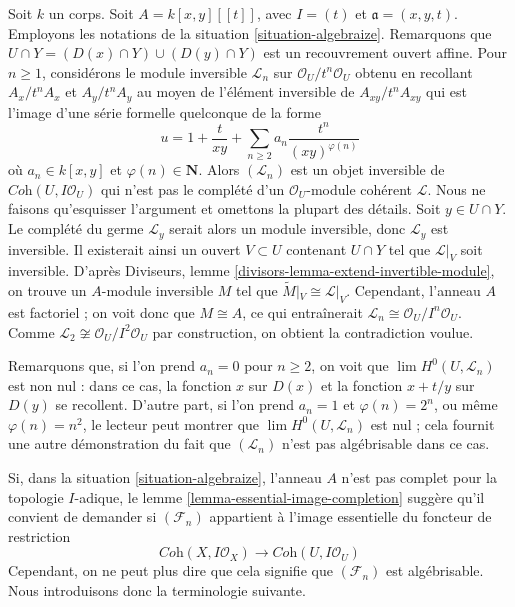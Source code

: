 \begin{example}
\label{example-not-algebraizable}
Soit $k$ un corps. Soit $A = k[x, y][[t]]$, avec $I = (t)$ et
$\mathfrak a = (x, y, t)$. Employons les notations de la
situation \ref{situation-algebraize}. Remarquons que
$U \cap Y = (D(x) \cap Y) \cup (D(y) \cap Y)$ est un recouvrement
ouvert affine. Pour $n \geq 1$, considérons le module inversible
$\mathcal{L}_n$ sur $\mathcal{O}_U/t^n\mathcal{O}_U$
obtenu en recollant $A_x/t^nA_x$ et $A_y/t^nA_y$ au moyen de l'élément inversible
de $A_{xy}/t^nA_{xy}$ qui est l'image d'une série formelle quelconque
de la forme
$$
u = 1 + \frac{t}{xy} + \sum_{n \geq 2} a_n \frac{t^n}{(xy)^{\varphi(n)}}
$$
où $a_n \in k[x, y]$ et $\varphi(n) \in \mathbf{N}$.
Alors $(\mathcal{L}_n)$ est un objet inversible de
$\textit{Coh}(U, I\mathcal{O}_U)$ qui n'est pas le
complété d'un $\mathcal{O}_U$-module cohérent $\mathcal{L}$.
Nous ne faisons qu'esquisser l'argument et omettons la plupart des détails.
Soit $y \in U \cap Y$. Le complété du germe
$\mathcal{L}_y$ serait alors un module inversible, donc $\mathcal{L}_y$
est inversible. Il existerait ainsi un ouvert $V \subset U$
contenant $U \cap Y$ tel que $\mathcal{L}|_V$ soit inversible.
D'après Diviseurs, lemme \ref{divisors-lemma-extend-invertible-module},
on trouve un $A$-module inversible $M$ tel que
$\widetilde{M}|_V \cong \mathcal{L}|_V$. Cependant, l'anneau $A$
est factoriel ; on voit donc que $M \cong A$, ce qui entraînerait
$\mathcal{L}_n \cong \mathcal{O}_U/I^n\mathcal{O}_U$.
Comme $\mathcal{L}_2 \not \cong \mathcal{O}_U/I^2\mathcal{O}_U$
par construction, on obtient la contradiction voulue.

\medskip\noindent
Remarquons que, si l'on prend $a_n = 0$ pour $n \geq 2$, on voit
que $\lim H^0(U, \mathcal{L}_n)$ est non nul : dans ce cas,
la fonction $x$ sur $D(x)$ et la fonction $x + t/y$ sur $D(y)$
se recollent. D'autre part, si l'on prend $a_n = 1$ et $\varphi(n) = 2^n$,
ou même $\varphi(n) = n^2$, le lecteur peut montrer que
$\lim H^0(U, \mathcal{L}_n)$ est nul ; cela fournit une autre démonstration
du fait que $(\mathcal{L}_n)$ n'est pas algébrisable dans ce cas.
\end{example}

\noindent
Si, dans la situation \ref{situation-algebraize}, l'anneau $A$ n'est pas
complet pour la topologie $I$-adique, le lemme \ref{lemma-essential-image-completion}
suggère qu'il convient de demander si $(\mathcal{F}_n)$
appartient à l'image essentielle du foncteur de restriction
$$
\textit{Coh}(X, I\mathcal{O}_X)
\longrightarrow
\textit{Coh}(U, I\mathcal{O}_U)
$$
Cependant, on ne peut plus dire que cela signifie que $(\mathcal{F}_n)$
est algébrisable. Nous introduisons donc la terminologie suivante.

